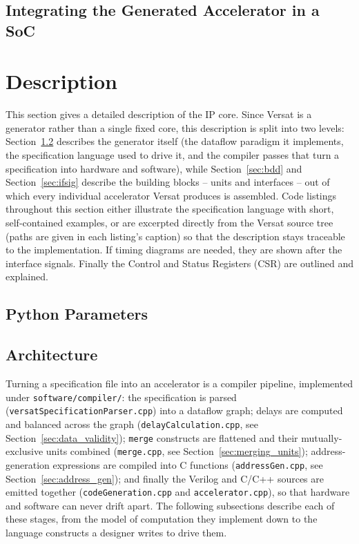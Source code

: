 \documentclass{ug}
\begin{document}
\subsection{Integrating the Generated Accelerator in a SoC}
\label{sec:soc_integration}


\ifdefined\SECTIONCLEARPAGE
\clearpage
\fi
\section{Description}

This section gives a detailed description of the IP core. Since Versat is a
generator rather than a single fixed core, this description is split into
two levels: Section~\ref{sec:architecture} describes the generator itself
(the dataflow paradigm it implements, the specification language used to
drive it, and the compiler passes that turn a specification into hardware
and software), while Section~\ref{sec:bdd} and Section~\ref{sec:ifsig}
describe the building blocks -- units and interfaces -- out of which every
individual accelerator Versat produces is assembled. Code listings
throughout this section either illustrate the specification language with
short, self-contained examples, or are excerpted directly from the Versat
source tree (paths are given in each listing's caption) so that the
description stays traceable to the implementation. If timing diagrams are
needed, they are shown after the interface signals. Finally the Control and
Status Registers (CSR) are outlined and explained.


\ifdefined\PYPARAMS
\subsection{Python Parameters}
\label{sec:py_params}

\fi

\subsection{Architecture}
\label{sec:architecture}

Turning a specification file into an accelerator is a compiler pipeline,
implemented under \texttt{software/compiler/}: the specification is parsed
(\texttt{versatSpecificationParser.cpp}) into a dataflow graph; delays are
computed and balanced across the graph (\texttt{delayCalculation.cpp}, see
Section~\ref{sec:data_validity}); \texttt{merge} constructs are flattened
and their mutually-exclusive units combined (\texttt{merge.cpp}, see
Section~\ref{sec:merging_units}); address-generation expressions are
compiled into C functions (\texttt{addressGen.cpp}, see
Section~\ref{sec:address_gen}); and finally the Verilog and C/C++ sources
are emitted together (\texttt{codeGeneration.cpp} and
\texttt{accelerator.cpp}), so that hardware and software can never drift
apart. The following subsections describe each of these stages, from the
model of computation they implement down to the language constructs a
designer writes to drive them.
\end{document}
